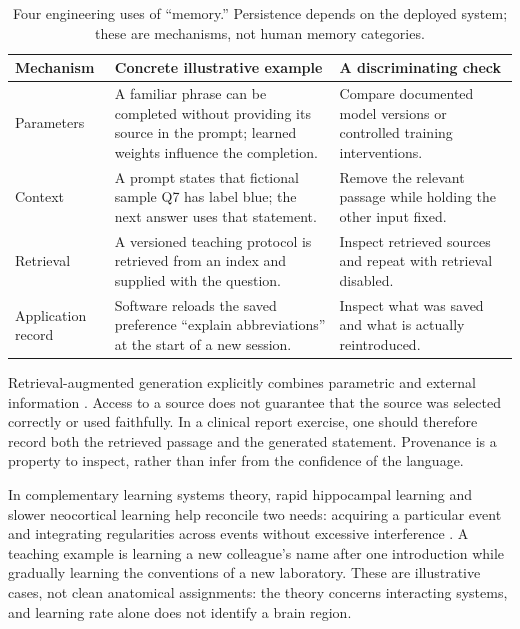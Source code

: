 \documentclass[11pt,a4paper]{article}
\begin{document}
\begin{table}[htbp]\centering\small
\caption{Four engineering uses of ``memory.'' Persistence depends on the deployed system; these are mechanisms, not human memory categories.}
\begin{tabularx}{\linewidth}{p{24mm}XX}\toprule
Mechanism & Concrete illustrative example & A discriminating check \\\midrule
Parameters & A familiar phrase can be completed without providing its source in the prompt; learned weights influence the completion. & Compare documented model versions or controlled training interventions.\\
Context & A prompt states that fictional sample Q7 has label blue; the next answer uses that statement. & Remove the relevant passage while holding the other input fixed.\\
Retrieval & A versioned teaching protocol is retrieved from an index and supplied with the question. & Inspect retrieved sources and repeat with retrieval disabled.\\
Application record & Software reloads the saved preference ``explain abbreviations'' at the start of a new session. & Inspect what was saved and what is actually reintroduced.\\\bottomrule
\end{tabularx}
\end{table}

Retrieval-augmented generation explicitly combines parametric and external information \citep{lewis2020}. Access to a source does not guarantee that the source was selected correctly or used faithfully. In a clinical report exercise, one should therefore record both the retrieved passage and the generated statement. Provenance is a property to inspect, rather than infer from the confidence of the language.

In complementary learning systems theory, rapid hippocampal learning and slower neocortical learning help reconcile two needs: acquiring a particular event and integrating regularities across events without excessive interference \citep{mcclelland1995}. A teaching example is learning a new colleague's name after one introduction while gradually learning the conventions of a new laboratory. These are illustrative cases, not clean anatomical assignments: the theory concerns interacting systems, and learning rate alone does not identify a brain region.
\end{document}
